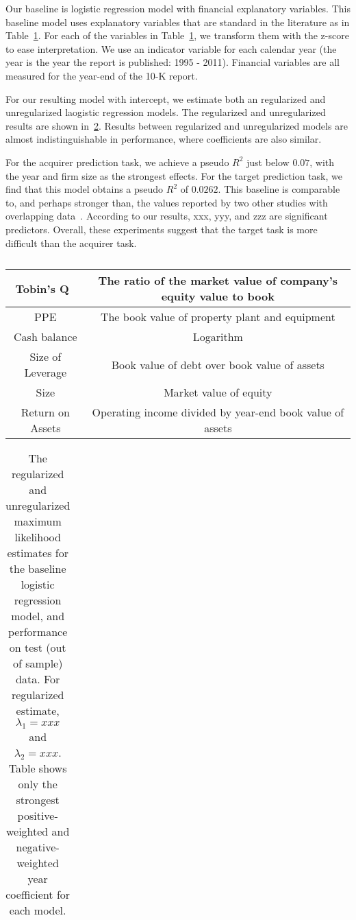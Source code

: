 \documentclass[11pt]{article}
\begin{document}
Our baseline is logistic regression model with financial explanatory variables. This baseline model uses explanatory
variables that are standard in the literature as in Table~\ref{tab:financial}. For each of
the variables in Table~\ref{tab:financial}, we transform them with the
z-score to ease interpretation. We use an indicator variable for each calendar
year (the year is the year the report is published: 1995 - 2011). Financial variables are all
measured for the year-end of the 10-K report.

For our resulting model with intercept, we estimate both an regularized and unregularized laogistic regression models. The
regularized and unregularized results are shown in~\ref{tab:baseline_results}. Results
between regularized and unregularized models are almost indistinguishable in performance, where coefficients
are also similar.

For the acquirer prediction task, we achieve a pseudo $R^{2}$ just below $0.07$, with the year
and firm size as the strongest effects. For the target prediction task, we find that this
model obtains a pseudo $R^{2}$ of $0.0262$. This baseline is comparable to, and perhaps stronger than,
the values reported by two other studies with overlapping data~\cite{cremers2008, edmans2012}. According to our results, xxx, yyy, and zzz are
significant predictors. Overall, these experiments suggest that the target task is more difficult than the acquirer task.

\begin{table}
  \begin{tabular}{|c|c|}
    \hline
Tobin's Q~\cite{xxxx} & The ratio of the market value of company's equity value to book \\ \hline
PPE & The book value of property plant and equipment \\ \hline
Cash balance & Logarithm \\ \hline
Size of Leverage & Book value of debt over book value of assets \\ \hline
Size & Market value of equity \\ \hline
Return on Assets & Operating income divided by year-end book value of
                   assets \\ \hline
  \end{tabular}
  \label{tab:financial}
  \caption{}
\end{table}

\begin{table}
  \begin{tabular}{|c|c|}
  \end{tabular}
  \label{tab:baseline_results}
  \caption{
The regularized and unregularized maximum likelihood estimates for the
baseline logistic regression model, and performance on test (out of
sample) data. For regularized estimate, $\lambda_{1} = xxx$ and
$\lambda_{2} = xxx$. Table shows only the strongest positive-weighted and negative-weighted
year coefficient for each model.}
\end{table}
\end{document}
